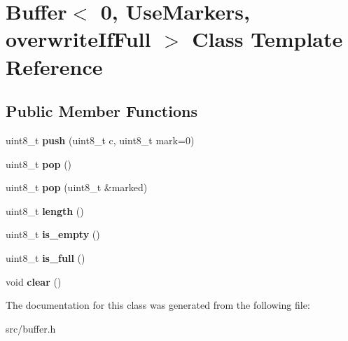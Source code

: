 \hypertarget{classBuffer_3_010_00_01UseMarkers_00_01overwriteIfFull_01_4}{}\section{Buffer$<$ 0, Use\+Markers, overwrite\+If\+Full $>$ Class Template Reference}
\label{classBuffer_3_010_00_01UseMarkers_00_01overwriteIfFull_01_4}
\subsection*{Public Member Functions}
\begin{DoxyCompactItemize}
\item 
uint8\+\_\+t {\bfseries push} (uint8\+\_\+t c, uint8\+\_\+t mark=0)\hypertarget{classBuffer_3_010_00_01UseMarkers_00_01overwriteIfFull_01_4_a462a4efa861532f102a2629bddb98286}{}\label{classBuffer_3_010_00_01UseMarkers_00_01overwriteIfFull_01_4_a462a4efa861532f102a2629bddb98286}

\item 
uint8\+\_\+t {\bfseries pop} ()\hypertarget{classBuffer_3_010_00_01UseMarkers_00_01overwriteIfFull_01_4_a2a401dd63d1fef6e4482d2beeeb2cb58}{}\label{classBuffer_3_010_00_01UseMarkers_00_01overwriteIfFull_01_4_a2a401dd63d1fef6e4482d2beeeb2cb58}

\item 
uint8\+\_\+t {\bfseries pop} (uint8\+\_\+t \&marked)\hypertarget{classBuffer_3_010_00_01UseMarkers_00_01overwriteIfFull_01_4_a89f41cf01211b523f3c41e39415e40fd}{}\label{classBuffer_3_010_00_01UseMarkers_00_01overwriteIfFull_01_4_a89f41cf01211b523f3c41e39415e40fd}

\item 
uint8\+\_\+t {\bfseries length} ()\hypertarget{classBuffer_3_010_00_01UseMarkers_00_01overwriteIfFull_01_4_ab420cb9bc314366ab5288b9cbe46f22f}{}\label{classBuffer_3_010_00_01UseMarkers_00_01overwriteIfFull_01_4_ab420cb9bc314366ab5288b9cbe46f22f}

\item 
uint8\+\_\+t {\bfseries is\+\_\+empty} ()\hypertarget{classBuffer_3_010_00_01UseMarkers_00_01overwriteIfFull_01_4_ac6d91d70dcab25fdf0bb88c9ae9912ce}{}\label{classBuffer_3_010_00_01UseMarkers_00_01overwriteIfFull_01_4_ac6d91d70dcab25fdf0bb88c9ae9912ce}

\item 
uint8\+\_\+t {\bfseries is\+\_\+full} ()\hypertarget{classBuffer_3_010_00_01UseMarkers_00_01overwriteIfFull_01_4_aa9f7cd8915684dbb2f334afe79df9e81}{}\label{classBuffer_3_010_00_01UseMarkers_00_01overwriteIfFull_01_4_aa9f7cd8915684dbb2f334afe79df9e81}

\item 
void {\bfseries clear} ()\hypertarget{classBuffer_3_010_00_01UseMarkers_00_01overwriteIfFull_01_4_a2b4c2ceff500dd7df0c2d1b3f05c47ab}{}\label{classBuffer_3_010_00_01UseMarkers_00_01overwriteIfFull_01_4_a2b4c2ceff500dd7df0c2d1b3f05c47ab}

\end{DoxyCompactItemize}


The documentation for this class was generated from the following file\+:\begin{DoxyCompactItemize}
\item 
src/buffer.\+h\end{DoxyCompactItemize}
